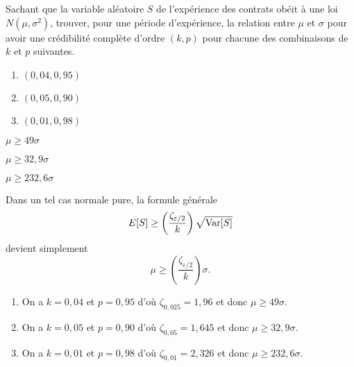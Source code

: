 \begin{exercice}
  Sachant que la variable aléatoire $S$ de l'expérience des contrats
  obéit à une loi $N(\mu, \sigma^{2})$, trouver, pour une période
  d'expérience, la relation entre $\mu$ et $\sigma$ pour avoir une
  crédibilité complète d'ordre $(k, p)$ pour chacune des combinaisons
  de $k$ et $p$ suivantes.
  \begin{enumerate}
  \item $(0,04, 0,95)$
  \item $(0,05, 0,90)$
  \item $(0,01, 0,98)$
  \end{enumerate}
  \begin{rep}
    \begin{inparaenum}
    \item $\mu \geq 49 \sigma$
    \item $\mu \geq 32,9 \sigma$
    \item $\mu \geq 232,6 \sigma$
    \end{inparaenum}
  \end{rep}
  \begin{sol}
    Dans un tel cas normale pure, la formule générale
    \begin{displaymath}
      E [ S ] \geq \left( \frac{\zeta_{\varepsilon/2}}{k} \right)
      \sqrt{\operatorname{Var} [ S ]}
    \end{displaymath}
    devient simplement
    \begin{displaymath}
      \mu \geq \left( \frac{\zeta_{\varepsilon/2}}{k} \right)
      \sigma.
    \end{displaymath}
    \begin{enumerate}
    \item On a $k = 0,04$ et $p = 0,95$ d'où $\zeta_{0,025} = 1,96$ et
      donc $\mu \geq 49 \sigma$.
    \item On a $k = 0,05$ et $p = 0,90$ d'où $\zeta_{0,05} = 1,645$ et
      donc $\mu \geq 32,9 \sigma$.
    \item On a $k = 0,01$ et $p = 0,98$ d'où $\zeta_{0,01} = 2,326$ et
      donc $\mu \geq 232,6 \sigma$.
    \end{enumerate}
  \end{sol}
\end{exercice}

